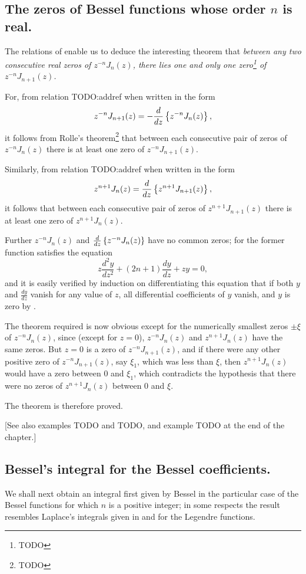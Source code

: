\documentclass{book}
\begin{document}
\subsection{The zeros of Bessel functions whose order $n$ is real.}
The relations of  enable us to deduce the
interesting theorem that \emph{between any two consecutive real zeros
  of $z^{-n}J_n(z)$, there lies one and only one zero\footnote{TODO}
  of $z^{-n}J_{n+1}(z)$.}

For, from relation TODO:addref when written in the form
$$
z^{-n} J_{n+1}(z) 
= 
- \frac{d}{dz} \left\{  z^{-n} J_n(z)  \right\},
$$
it follows from Rolle's theorem\footnote{TODO} that between each
consecutive pair of zeros of $z^{-n}J_n(z)$ there is at least one zero
of $z^{-n} J_{n+1}(z)$.

Similarly, from relation TODO:addref when written in the form
$$
z^{n+1} J_n(z) 
= 
\frac{d}{dz} \left\{  z^{n+1} J_{n+1}(z)  \right\},
$$
it follows that between each consecutive pair of zeros of 
$z^{n+1}J_{n+1}(z)$ there is at least one zero of 
$z^{n+1}J_n(z)$.

Further $z^{-n}J_n(z)$ and 
$\frac{d}{dz} \left\{  z^{-n} J_n(z)   \right\}$ have no common zeros; for
the former function satisfies the equation
$$
z \frac{d^2 y}{dz^2} + (2n+1) \frac{dy}{dz} + zy = 0,
$$
and it is easily verified by induction on differentiating this
equation that if both $y$ and $\frac{dy}{dz}$ vanish for any value of
$z$, all differential coefficients of $y$ vanish, and $y$ is zero by 
.

The theorem required is now obvious except for the numerically
smallest zeros $\pm \xi$ of $z^{-n}J_n(z)$, since (except for $z=0$), 
$z^{-n}J_n(z)$ and $z^{n+1}J_n(z)$ have the same zeros. But $z=0$ is a
zero of $z^{-n}J_{n+1}(z)$, and if there were any other positive zero
of $z^{-n}J_{n+1}(z)$, say $\xi_1$, which was less than $\xi$, then
$z^{n+1}J_n(z)$ would have a zero between $0$ and $\xi_1$, which
contradicts the hypothesis that there were no zeros of 
$z^{n+1}J_n(z)$ between $0$ and $\xi$.

The theorem is therefore proved.

[See also  examples TODO and TODO, and example
TODO at the end of the chapter.]
%
%
\subsection{Bessel's integral for the Bessel coefficients.}
We shall next obtain an integral first given by Bessel in the
particular case of the Bessel functions for which $n$ is a positive
integer; in some respects the result resembles Laplace's integrals
given in  and 
for the Legendre functions.
\end{document}
